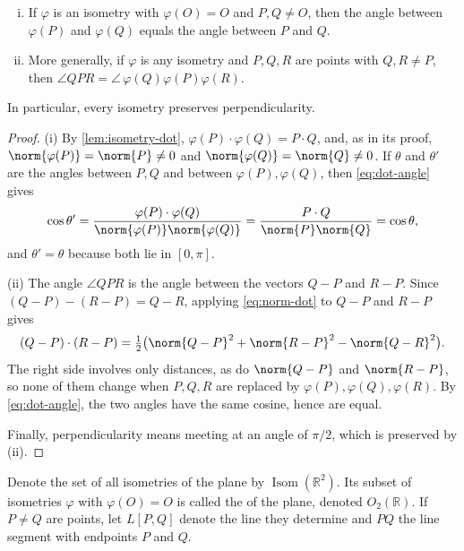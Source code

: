 \begin{corollary}\label{cor:isometry-angle}
	\begin{enumerate}[(i)]
		\item If \(\varphi\) is an isometry with \(\varphi(O) = O\) and \(P, Q \neq O\), then
		      the angle between \(\varphi(P)\) and \(\varphi(Q)\) equals the angle between
		      \(P\) and \(Q\).
		\item More generally, if \(\varphi\) is any isometry and \(P, Q, R\) are points with
		      \(Q, R \neq P\), then
		      \(\angle QPR = \angle\,\varphi(Q)\varphi(P)\varphi(R)\).
	\end{enumerate}
	In particular, every isometry preserves perpendicularity.
\end{corollary}

\begin{proof}
	(i) By \autoref{lem:isometry-dot}, \(\varphi(P)\cdot\varphi(Q) = P\cdot Q\), and, as in
	its proof, \(\norm{\varphi(P)} = \norm{P} \neq 0\) and
	\(\norm{\varphi(Q)} = \norm{Q} \neq 0\). If \(\theta\) and \(\theta'\) are the angles
	between \(P, Q\) and between \(\varphi(P), \varphi(Q)\), then \eqref{eq:dot-angle} gives
	\[
		\cos\theta'
		= \frac{\varphi(P)\cdot\varphi(Q)}{\norm{\varphi(P)}\norm{\varphi(Q)}}
		= \frac{P\cdot Q}{\norm{P}\norm{Q}}
		= \cos\theta,
	\]
	and \(\theta' = \theta\) because both lie in \([0,\pi]\).

	(ii) The angle \(\angle QPR\) is the angle between the vectors \(Q - P\) and \(R - P\).
	Since \((Q-P) - (R-P) = Q - R\), applying \eqref{eq:norm-dot} to \(Q-P\) and \(R-P\)
	gives
	\[
		(Q-P)\cdot(R-P)
		= \tfrac12\bigl(\norm{Q-P}^2 + \norm{R-P}^2 - \norm{Q-R}^2\bigr).
	\]
	The right side involves only distances, as do \(\norm{Q-P}\) and \(\norm{R-P}\), so
	none of them change when \(P, Q, R\) are replaced by \(\varphi(P), \varphi(Q),
	\varphi(R)\). By \eqref{eq:dot-angle}, the two angles have the same cosine, hence are
	equal.

	Finally, perpendicularity means meeting at an angle of \(\pi/2\), which is preserved by
	(ii).
\end{proof}

\begin{notation}
	Denote the set of all isometries of the plane by \(\operatorname{Isom}(\mathbb{R}^2)\).
	Its subset of isometries \(\varphi\) with \(\varphi(O) = O\) is called the
	 of the plane, denoted \(O_2(\mathbb{R})\). If \(P \neq Q\) are
	points, let \(L[P,Q]\) denote the line they determine and \(PQ\) the line segment with
	endpoints \(P\) and \(Q\).
\end{notation}

